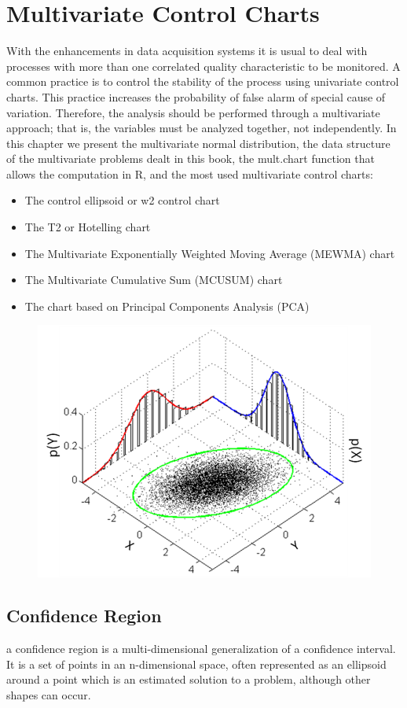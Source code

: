\documentclass[]{article}
\begin{document}
\section{Multivariate Control Charts}
{\large
With the enhancements in data acquisition systems it is usual to deal with processes
with more than one correlated quality characteristic to be monitored. A common
practice is to control the stability of the process using univariate control charts. This
practice increases the probability of false alarm of special cause of variation.
Therefore, the analysis should be performed through a multivariate approach;
that is, the variables must be analyzed together, not independently.
In this chapter we present the multivariate normal distribution, the data structure
of the multivariate problems dealt in this book, the mult.chart function that allows
the computation in R, and the most used multivariate control charts:
}
\begin{itemize}
\item The control ellipsoid or w2 control chart
\item The T2 or Hotelling chart
\item The Multivariate Exponentially Weighted Moving Average (MEWMA) chart
\item The Multivariate Cumulative Sum (MCUSUM) chart
\item The chart based on Principal Components Analysis (PCA)
\end{itemize} 

 
 \begin{figure}
\centering
\includegraphics[width=0.7\linewidth]{./793px-MultivariateNormal}
\caption{}
\label{fig:793px-MultivariateNormal}
\end{figure}

\subsection{Confidence Region}
a confidence region is a multi-dimensional generalization of a confidence interval. It is a set of points in an n-dimensional space, often represented as an ellipsoid around a point which is an estimated solution to a problem, although other shapes can occur.
\end{document}
